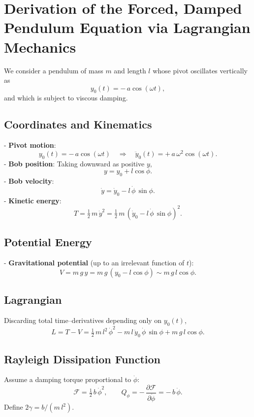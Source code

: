 \documentclass[12pt, letterpaper]{article}
\begin{document}
\section{Derivation of the Forced, Damped Pendulum Equation via Lagrangian Mechanics}\label{sec:el_derivation_butikov_eom}
We consider a pendulum of mass $m$ and length $l$ whose pivot oscillates vertically as
$$
y_0(t) = -\,a\cos(\omega t),
$$
and which is subject to viscous damping.


\subsection{Coordinates and Kinematics}

- \textbf{Pivot motion}:
  $$
    y_0(t) = -\,a\cos(\omega t)
    \quad\Longrightarrow\quad
    \ddot y_0(t) = +\,a\,\omega^2\cos(\omega t).
  $$
- \textbf{Bob position}:  
  Taking downward as positive $y$,
  $$
    y = y_0 + l\cos\phi.
  $$
- \textbf{Bob velocity}:  
  $$
    \dot y = \dot y_0 - l\,\dot\phi\,\sin\phi.
  $$
- \textbf{Kinetic energy}:  
  $$
    T = \tfrac12\,m\,\dot y^{2}
      = \tfrac12\,m\,\left(\dot y_0 - l\,\dot\phi\,\sin\phi\right)^{2}.
  $$


\subsection{Potential Energy}

- \textbf{Gravitational potential} (up to an irrelevant function of $t$):
  $$
    V = m\,g\,y = m\,g\,(y_0 - l\cos\phi)
      \sim m\,g\,l\cos\phi.
  $$


\subsection{Lagrangian}

Discarding total time–derivatives depending only on $y_0(t)$,
$$
L = T - V
  = \tfrac12\,m\,l^2\,\dot\phi^{2}
    - m\,l\,\dot y_0\,\dot\phi\,\sin\phi
    + m\,g\,l\cos\phi.
$$


\subsection{Rayleigh Dissipation Function}

Assume a damping torque proportional to $\dot\phi$:
$$
\mathcal{F} = \tfrac12\,b\,\dot\phi^{2},
\qquad
Q_\phi = -\,\frac{\partial\mathcal{F}}{\partial\dot\phi} = -\,b\,\dot\phi.
$$
Define $2\gamma = b/(m\,l^2)$.
\end{document}
